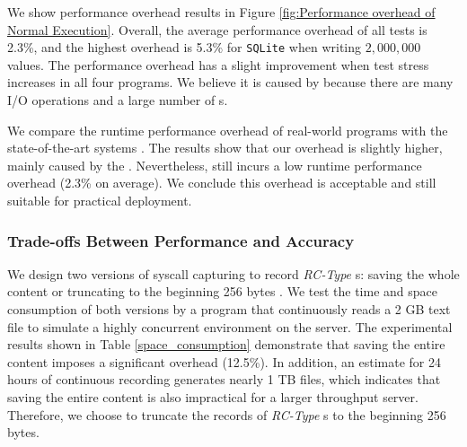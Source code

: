 We show performance overhead results in Figure \ref{fig:Performance overhead of
    Normal Execution}.
Overall, the average performance overhead of all tests is 2.3\%, and the highest
overhead is 5.3\% for \texttt{SQLite} when writing $2,000,000$ values. The
performance overhead has a slight improvement when test stress increases in all
four programs. We believe it is caused by \TheName because there are many I/O
operations and a large number of \syscall{}s.

We compare the runtime performance overhead of real-world programs with the
state-of-the-art systems \cite{cui2018rept, kasikci_lazy_2017}. The results show
that our overhead is slightly higher, mainly caused by the
\TheName. Nevertheless, \TheName still incurs a low runtime performance overhead
(2.3\% on average). We conclude this overhead is acceptable and still suitable for
practical deployment.

\subsubsection{Trade-offs Between Performance and Accuracy} \label{space-consumption}


We design two versions of syscall capturing to record \textit{RC-Type}
\syscall{}s: saving the whole content or truncating to the beginning 256 bytes
. We test the time and space consumption of both
versions by a program that continuously reads a 2 GB text file to simulate a
highly concurrent environment on the server. The experimental results shown in
Table \ref{space_consumption} demonstrate that saving the entire content imposes
a significant overhead (12.5\%). In addition, an estimate for 24 hours of
continuous recording generates nearly 1 TB files, which indicates that saving
the entire content is also impractical for a larger throughput server.
Therefore, we choose to truncate the records of \textit{RC-Type} \syscall{}s to
the beginning 256 bytes.

